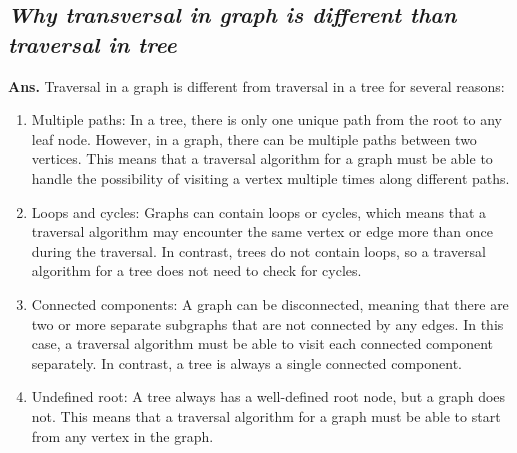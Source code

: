 \documentclass{article}
\begin{document}
\subsection{\textit{Why transversal in graph is different than traversal in tree}}
\textbf{Ans.} Traversal in a graph is different from traversal in a tree for several reasons:
\begin{enumerate}
    \item Multiple paths: In a tree, there is only one unique path from the root to any leaf node. However, in a graph, there can be multiple paths between two vertices. This means that a traversal algorithm for a graph must be able to handle the possibility of visiting a vertex multiple times along different paths.
    \item Loops and cycles: Graphs can contain loops or cycles, which means that a traversal algorithm may encounter the same vertex or edge more than once during the traversal. In contrast, trees do not contain loops, so a traversal algorithm for a tree does not need to check for cycles.
    \item Connected components: A graph can be disconnected, meaning that there are two or more separate subgraphs that are not connected by any edges. In this case, a traversal algorithm must be able to visit each connected component separately. In contrast, a tree is always a single connected component.
    \item Undefined root: A tree always has a well-defined root node, but a graph does not. This means that a traversal algorithm for a graph must be able to start from any vertex in the graph.
\end{enumerate}
\end{document}
